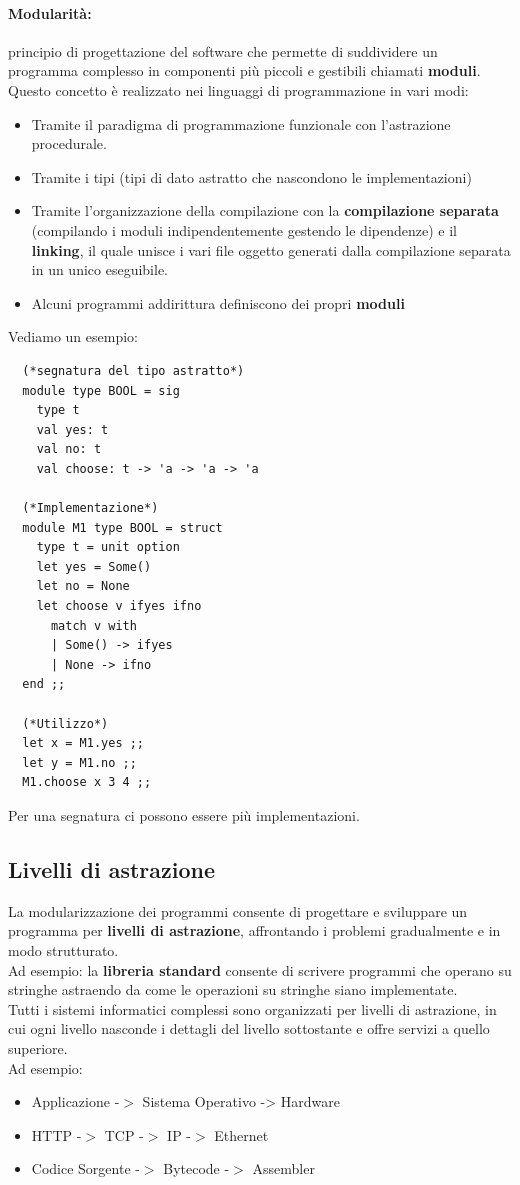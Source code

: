 \documentclass[12pt,a4paper]{article}
\begin{document}
\paragraph{Modularità:} principio di progettazione del software che permette di suddividere un programma complesso in componenti più piccoli e gestibili chiamati \textbf{moduli}.\\
Questo concetto è realizzato nei linguaggi di programmazione in vari modi:
\begin{itemize}
  \item Tramite il paradigma di programmazione funzionale con l'astrazione procedurale.\\
  \item Tramite i tipi (tipi di dato astratto che nascondono le implementazioni)
  \item Tramite l'organizzazione della compilazione con la \textbf{compilazione separata} (compilando i moduli indipendentemente gestendo le dipendenze) e il \textbf{linking}, il quale unisce i vari file oggetto generati dalla compilazione separata in un unico eseguibile.
  \item Alcuni programmi addirittura definiscono dei propri \textbf{moduli}
\end{itemize}
Vediamo un esempio:
\begin{lstlisting}
  (*segnatura del tipo astratto*)
  module type BOOL = sig
    type t
    val yes: t
    val no: t
    val choose: t -> 'a -> 'a -> 'a

  (*Implementazione*)
  module M1 type BOOL = struct
    type t = unit option
    let yes = Some()
    let no = None
    let choose v ifyes ifno
      match v with
      | Some() -> ifyes
      | None -> ifno
  end ;;

  (*Utilizzo*)
  let x = M1.yes ;;
  let y = M1.no ;;
  M1.choose x 3 4 ;;
\end{lstlisting}
Per una segnatura ci possono essere più implementazioni.\\
\subsection{Livelli di astrazione}
La modularizzazione dei programmi consente di progettare e sviluppare un programma per \textbf{livelli di astrazione}, affrontando i problemi gradualmente e in modo strutturato.\\
Ad esempio: la \textbf{libreria standard} consente di scrivere programmi che operano su stringhe astraendo da come le operazioni su stringhe siano implementate.\\
Tutti i sistemi informatici complessi sono organizzati per livelli di astrazione, in cui ogni livello nasconde i dettagli del livello sottostante e offre servizi a quello superiore.\\
Ad esempio:
\begin{itemize}
  \item Applicazione -$>$ Sistema Operativo -> Hardware
  \item HTTP -$>$ TCP -$>$ IP -$>$ Ethernet
  \item Codice Sorgente -$>$ Bytecode -$>$ Assembler
\end{itemize}
\end{document}
